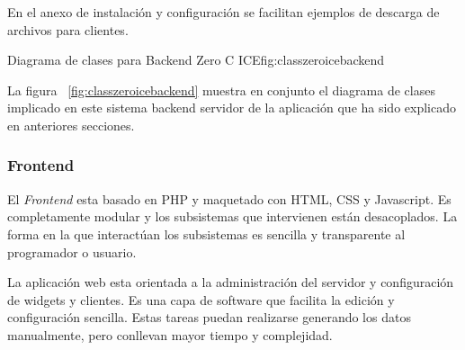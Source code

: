 En el anexo de instalación y configuración se facilitan ejemplos de descarga de
archivos para clientes.

\newpage

%
{Diagrama de clases para Backend Zero C ICE}{fig:classzeroicebackend}

\newpage

La figura ~\ref{fig:classzeroicebackend} muestra en conjunto el diagrama de
clases implicado en este sistema backend servidor de la aplicación que ha sido
explicado en anteriores secciones.

\subsubsection{Frontend}

El \emph{Frontend} esta basado en PHP y maquetado con HTML\cite{W3C99}, CSS\cite{W3C06}
y Javascript. Es completamente modular y los subsistemas que intervienen están
desacoplados. La forma en la que interactúan los subsistemas es sencilla y
transparente al programador o usuario.

La aplicación web esta orientada a la administración del servidor y
configuración de widgets y clientes. Es una capa de software que facilita la
edición y configuración sencilla. Estas tareas puedan realizarse
generando los datos manualmente, pero conllevan mayor tiempo y complejidad.

